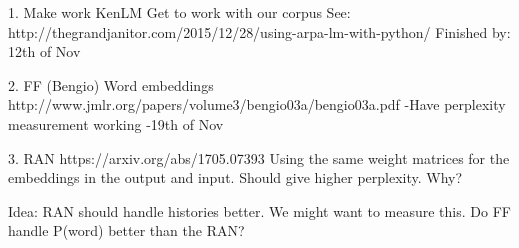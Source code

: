 
1. Make  work KenLM
Get to work with our corpus
See: http://thegrandjanitor.com/2015/12/28/using-arpa-lm-with-python/
Finished by: 12th of Nov

2. FF (Bengio)
Word embeddings
http://www.jmlr.org/papers/volume3/bengio03a/bengio03a.pdf
-Have perplexity measurement working
-19th of Nov

3. RAN
https://arxiv.org/abs/1705.07393
Using the same weight matrices for the embeddings in the output and input. Should give higher perplexity. Why?

Idea:
RAN should handle histories better. We might want to measure this.
Do FF handle P(word) better than the RAN?
